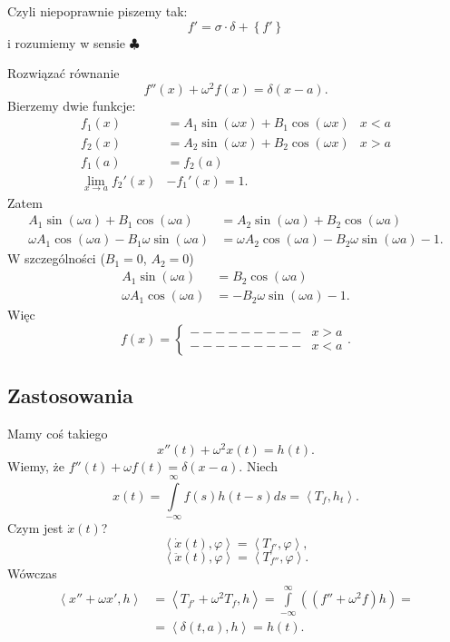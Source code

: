 \documentclass[../main.tex]{subfiles}
\begin{document}
Czyli niepoprawnie piszemy tak:
\[
    f' = \sigma \cdot \delta + \left\{ f' \right\}
\]
i rozumiemy w sensie $\clubsuit$
\begin{przyklad}
    Rozwiązać równanie
    \[
        f''(x) + \omega^2 f(x) = \delta(x-a)
    .\]
Bierzemy dwie funkcje:
\begin{align*}
    f_1(x) &= A_1 \sin(\omega x) + B_1\cos(\omega x) & x < a\\
    f_2(x) &= A_2 \sin(\omega x) + B_2\cos(\omega x) & x > a\\
    f_1(a) &= f_2(a)\\
    \lim_{x \to a} f_2'(x)& - f_1'(x) = 1
.\end{align*}
Zatem
\begin{align*}
    A_1 \sin(\omega a) + B_1 \cos(\omega a) &= A_2 \sin(\omega a) + B_2 \cos(\omega a)\\
    \omega A_1 \cos(\omega a) - B_1 \omega \sin(\omega a) &= \omega A_2 \cos(\omega a) - B_2 \omega \sin (\omega a) - 1
.\end{align*}
    W szczególności ($B_1 = 0$, $A_2 = 0$)
    \begin{align*}
        A_1\sin(\omega a) &= B_2 \cos(\omega a)\\
        \omega A_1 \cos(\omega a) &= -B_2 \omega \sin(\omega a) - 1
    .\end{align*}
    Więc
    \[
        f(x) = \begin{cases}
            --------- & x > a\\
            --------- & x < a
        \end{cases}
    .\]
\end{przyklad}
\subsection{Zastosowania}
Mamy coś takiego
\begin{equation}
    \label{eqn:w24-1}
    x''(t) + \omega^2 x(t) = h(t) \tag{$\star$}.
\end{equation}
Wiemy, że $f''(t) + \omega f(t) = \delta(x-a)$. Niech
\[
    x(t) = \int\limits_{-\infty}^{\infty} f(s)h(t-s)ds =  \left<T_f, h_t \right>
.\]
Czym jest $\dot{x}(t)$?
\[
    \left<\dot{x}(t),\varphi \right> = \left<T_{f'}, \varphi \right>
,\]
\[
    \left<\ddot{x}(t), \varphi \right> = \left<T_{f''}, \varphi \right>
.\]
Wówczas
\begin{align*}
    \left<x'' + \omega x', h \right> &= \left<T_{f'} + \omega^2 T_f, h \right> = \int\limits_{-\infty}^{\infty} \left( (f'' + \omega^2 f)h \right) =\\
    &= \left<\delta(t,a), h \right> = h(t)
.\end{align*}
\end{document}
